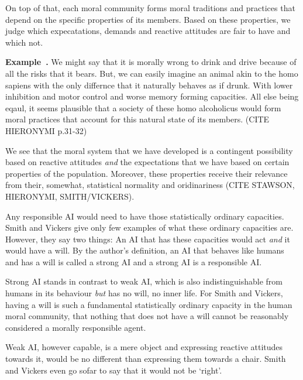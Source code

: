 \documentclass{article}
\newcounter{example}
\newenvironment{example}[1][]{\refstepcounter{example}\par\medskip
   \noindent \textbf{Example~\theexample. #1} \rmfamily}{\medskip}
\begin{document}
On top of that, each moral community forms moral traditions and practices that
depend on the specific properties of its members. Based on these properties, we
judge which expecatations, demands and reactive attitudes are fair to have and
which not.

\begin{example}
		We might say that it is morally wrong to drink and drive because
		of all the risks that it bears. But, we can easily imagine an
		animal akin to the homo sapiens with the only differnce that it
		naturally behaves as if drunk. With lower inhibition and motor
		control and worse memory forming capacities. All else being
		eqaul, it seems plausible that a society of these homo
		alcoholicus would form moral
		practices that account for this natural state of its members.
		(CITE HIERONYMI p.31-32)
\end{example}

We see that the moral system that we have developed is a contingent possibility
based on reactive attitudes \textit{and} the expectations that we have based on
certain properties of the population. Moreover, these properties
receive their relevance from their, somewhat, statistical normality and
oridinariness (CITE STAWSON, HIERONYMI, SMITH/VICKERS). 

Any responsible AI would need to have those statistically ordinary capacities.
Smith and Vickers give only few examples of what these ordinary capacities are.
However, they say two things: An AI that has these capacities would act
 \textit{and} it would have a will. 
By the author's definition, an AI that behaves like humans and has a will is
called a strong AI and a strong AI is a responsible AI. 

Strong AI stands in contrast to weak AI, which is also indistinguishable from
humans in its behaviour \textit{but} has no will, no inner life. For Smith and
Vickers, having a will is such a fundamental statistically ordinary capacity in
the human moral community, that nothing that does not have a will cannot be
reasonably considered a morally responsible agent.

Weak AI, however capable, is a mere object and expressing reactive attitudes
towards it, would be no different than expressing them towards a chair. Smith
and Vickers even go sofar to say that it would not be `right'.\\
\end{document}
